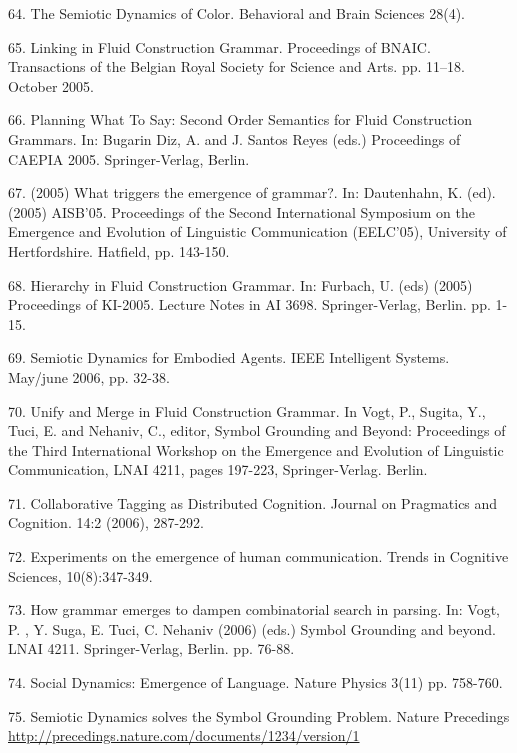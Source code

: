 64. \citet{Steels:05c} The Semiotic Dynamics of Color. Behavioral and Brain Sciences 28(4). 

\enlargethispage{1\baselineskip}
65. \citet{Steels:05d} Linking in Fluid Construction Grammar. Proceedings of BNAIC. Transactions of the Belgian Royal Society for 
Science and Arts. pp. 11--18. October 2005.  

\enlargethispage{1em}
66. \citet{Steels:05e} Planning What To Say: Second Order Semantics for Fluid Construction Grammars. 
In: Bugarin Diz, A. and J. Santos Reyes (eds.) Proceedings of CAEPIA 2005. Springer-Verlag, Berlin. 

67. \citet{Steels:05f} (2005) What triggers the emergence of grammar?. In: Dautenhahn, K. (ed). (2005) AISB'05.  Proceedings of the 
Second International Symposium on the Emergence and Evolution of Linguistic Communication (EELC'05), University of Hertfordshire. Hatfield, pp. 143-150. 

68. \citet{Steels:05g} Hierarchy in Fluid Construction Grammar. 
In: Furbach, U. (eds) (2005) Proceedings of KI-2005. Lecture Notes in AI 3698. Springer-Verlag, Berlin. pp. 1-15. 

69. \citet{Steels:06a} Semiotic Dynamics for Embodied Agents. IEEE Intelligent Systems. May/june 2006, pp. 32-38. 

70. \citet{Steels:06b} Unify and Merge in Fluid Construction Grammar. In Vogt, P., Sugita, Y., Tuci, E. and Nehaniv, C., editor, Symbol Grounding and Beyond: Proceedings of the Third International Workshop on the Emergence and Evolution of Linguistic Communication, LNAI 4211, pages 197-223, Springer-Verlag. Berlin. 

71. \citet{Steels:06c} Collaborative Tagging as Distributed Cognition. Journal on 
Pragmatics and Cognition. 14:2 (2006), 287-292. 

72. \citet{Steels:06d} Experiments on the emergence of human communication. Trends in Cognitive Sciences, 10(8):347-349.

73. \citet{Steels:06e} How grammar emerges to dampen combinatorial search in parsing. In: Vogt, P. , Y. Suga, E. Tuci, C. Nehaniv (2006) (eds.) Symbol Grounding and beyond. LNAI 4211. Springer-Verlag, Berlin. pp. 76-88. 

74. \citet{Loreto:07a} Social Dynamics: Emergence of Language. Nature Physics 3(11) pp. 758-760. 

75. \citet{Steels:07b} Semiotic Dynamics solves the Symbol Grounding Problem. Nature Precedings 
\url{http://precedings.nature.com/documents/1234/version/1}

